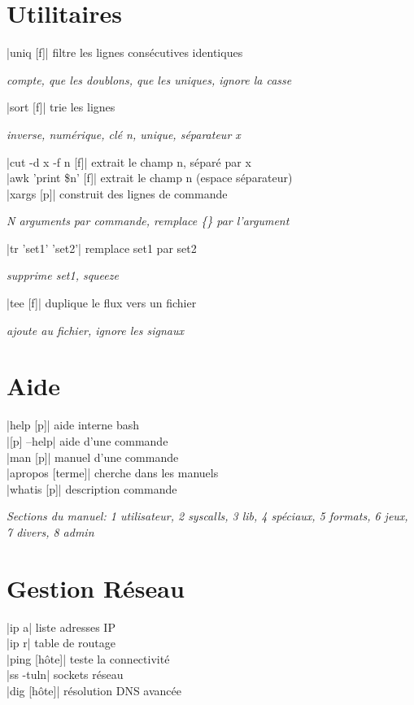 \documentclass[9pt]{extarticle}
\newcommand{\lstcode}[1]{\inlinecode{\detokenize{#1}}}
\newenvironment{cmdblock}{%
  \par\setlength{\parindent}{0pt}\setlength{\parskip}{0pt}%
}{\par}
\newlength{\cmdoptindent}
\newcommand{\cmdopt}[1]{%
  \hspace*{\cmdoptindent}%
  \begin{minipage}[t]{\dimexpr\linewidth-\cmdoptindent\relax}
    \RaggedRight \itshape #1%
  \end{minipage}\par
}
\begin{document}
\begin{multicols}{4}
\section*{Utilitaires}
\begin{cmdblock}
\code|uniq [f]| \quad filtre les lignes consécutives identiques \\
\cmdopt{\lstcode{-c} compte, \lstcode{-d} que les doublons,
        \lstcode{-u} que les uniques, \lstcode{-i} ignore la casse}
\code|sort [f]| \quad trie les lignes \\
\cmdopt{\lstcode{-r} inverse, \lstcode{-n} numérique,
        \lstcode{-k n} clé n, \lstcode{-u} unique,
        \lstcode{-t x} séparateur x}
\code|cut -d x -f n [f]| \quad extrait le champ n, séparé par x \\
\code|awk '{print \$n}' [f]| \quad extrait le champ n (espace séparateur) \\
\code|xargs [p]| \quad construit des lignes de commande \\
\cmdopt{\lstcode{-n N} N arguments par commande,
        \lstcode{-I \{\}} remplace \{\} par l'argument}
\code|tr 'set1' 'set2'| \quad remplace set1 par set2 \\
\cmdopt{\lstcode{-d} supprime set1, \lstcode{-s} squeeze}
\code|tee [f]| \quad duplique le flux vers un fichier \\
\cmdopt{\lstcode{-a} ajoute au fichier, \lstcode{-i} ignore les signaux}
\end{cmdblock}

\section*{Aide}
\begin{cmdblock}
\code|help [p]| \quad aide interne bash \\
\code|[p] --help| \quad aide d'une commande \\
\code|man [p]| \quad manuel d'une commande \\
\code|apropos [terme]| \quad cherche dans les manuels \\
\code|whatis [p]| \quad description commande \\
\end{cmdblock}

\emph{Sections du manuel: 1 utilisateur, 2 syscalls, 3 lib, 4 spéciaux, 5 formats, 6 jeux, 7 divers, 8 admin} \\

\section*{Gestion Réseau}
\begin{cmdblock}
\code|ip a| \quad liste adresses IP \\
\code|ip r| \quad table de routage \\
\code|ping [hôte]| \quad teste la connectivité \\
\code|ss -tuln| \quad sockets réseau \\
\code|dig [hôte]| \quad résolution DNS avancée \\
\end{cmdblock}


\end{multicols}
\end{document}
